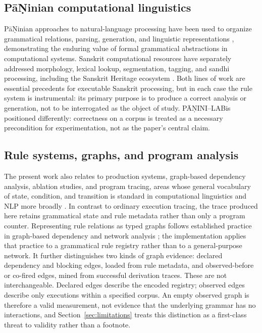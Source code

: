 \documentclass[conference]{IEEEtran}
\newcommand{\system}{P\={A}\d{N}INI--LAB}
\begin{document}
\subsection{P\={a}\d{N}inian computational linguistics}
P\={a}\d{N}inian approaches to natural-language processing have been used to organize grammatical relations, parsing, generation, and linguistic representations \cite{bharati1995}, demonstrating the enduring value of formal grammatical abstractions in computational systems. Sanskrit computational resources have separately addressed morphology, lexical lookup, segmentation, tagging, and sandhi processing, including the Sanskrit Heritage ecosystem \cite{huet2006,huet2010}. Both lines of work are essential precedents for executable Sanskrit processing, but in each case the rule system is instrumental: its primary purpose is to produce a correct analysis or generation, not to be interrogated as the object of study. \system is positioned differently: correctness on a corpus is treated as a necessary precondition for experimentation, not as the paper's central claim.

\subsection{Rule systems, graphs, and program analysis}
The present work also relates to production systems, graph-based dependency analysis, ablation studies, and program tracing, areas whose general vocabulary of state, condition, and transition is standard in computational linguistics and NLP more broadly \cite{jurafsky2023}. In contrast to ordinary execution tracing, the trace produced here retains grammatical state and rule metadata rather than only a program counter. Representing rule relations as typed graphs follows established practice in graph-based dependency and network analysis \cite{hagberg2008}; the implementation applies that practice to a grammatical rule registry rather than to a general-purpose network. It further distinguishes two kinds of graph evidence: declared dependency and blocking edges, loaded from rule metadata, and observed-before or co-fired edges, mined from successful derivation traces. These are not interchangeable. Declared edges describe the encoded registry; observed edges describe only executions within a specified corpus. An empty observed graph is therefore a valid measurement, not evidence that the underlying grammar has no interactions, and Section~\ref{sec:limitations} treats this distinction as a first-class threat to validity rather than a footnote.
\end{document}
